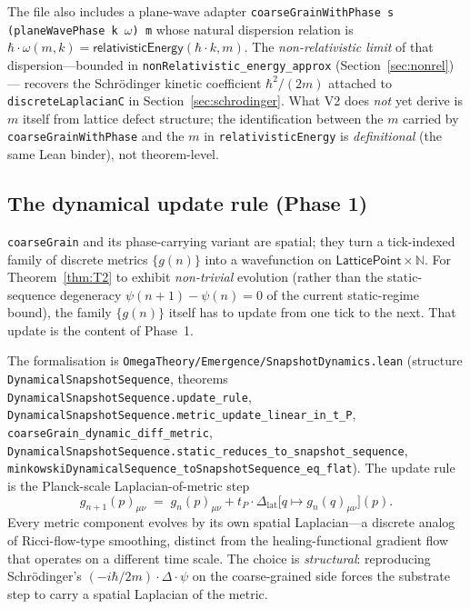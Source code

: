 \documentclass[11pt,a4paper,twoside]{article}
\theoremstyle{definition}
\newcommand{\Nbb}{\mathbb{N}}
\newcommand{\tP}{t_P}
\newcommand{\code}[1]{\texttt{#1}}
\begin{document}
The file also includes a plane-wave adapter
\code{coarseGrainWithPhase\,s\,(planeWavePhase\,k\,$\omega$)\,m} whose
natural dispersion relation is
$\hbar\cdot\omega(m,k)=\mathsf{relativisticEnergy}(\hbar\cdot k,m)$.
The \emph{non-relativistic limit} of that dispersion---bounded in
\code{nonRelativistic\_energy\_approx} (Section~\ref{sec:nonrel})---
recovers the Schr\"odinger kinetic coefficient $\hbar^{2}/(2m)$
attached to \code{discreteLaplacianC} in Section~\ref{sec:schrodinger}.
What V2 does \emph{not} yet derive is $m$ itself from lattice defect
structure; the identification between the $m$ carried by
\code{coarseGrainWithPhase} and the $m$ in
\code{relativisticEnergy} is \emph{definitional} (the same Lean
binder), not theorem-level.

\subsection{The dynamical update rule (Phase 1)}\label{sec:dynamical}

\code{coarseGrain} and its phase-carrying variant are spatial; they
turn a tick-indexed family of discrete metrics $\{g(n)\}$ into a
wavefunction on $\mathsf{LatticePoint}\times\Nbb$. For
Theorem~\ref{thm:T2} to exhibit \emph{non-trivial} evolution (rather
than the static-sequence degeneracy $\psi(n+1)-\psi(n)=0$ of the
current static-regime bound), the family $\{g(n)\}$ itself has to
update from one tick to the next. That update is the content of
Phase~1.

The formalisation is \code{OmegaTheory/Emergence/SnapshotDynamics.lean}
(structure \code{DynamicalSnapshotSequence}, theorems
\code{DynamicalSnapshotSequence.update\_rule},
\code{DynamicalSnapshotSequence.metric\_update\_linear\_in\_t\_P},
\code{coarseGrain\_dynamic\_diff\_metric},
\code{DynamicalSnapshotSequence.static\_reduces\_to\_snapshot\_sequence},
\code{minkowskiDynamicalSequence\_toSnapshotSequence\_eq\_flat}). The
update rule is the Planck-scale Laplacian-of-metric step
\[
g_{n+1}(p)_{\mu\nu}
 \;=\; g_{n}(p)_{\mu\nu}
     + \tP\cdot\Delta_{\mathrm{lat}}\bigl[q\mapsto g_{n}(q)_{\mu\nu}\bigr](p).
\]
Every metric component evolves by its own spatial Laplacian---a
discrete analog of Ricci-flow-type smoothing, distinct from the
healing-functional gradient flow that operates on a different time
scale. The choice is \emph{structural}: reproducing Schr\"odinger's
$(-i\hbar/2m)\cdot\Delta\cdot\psi$ on the coarse-grained side forces
the substrate step to carry a spatial Laplacian of the metric.
\end{document}
